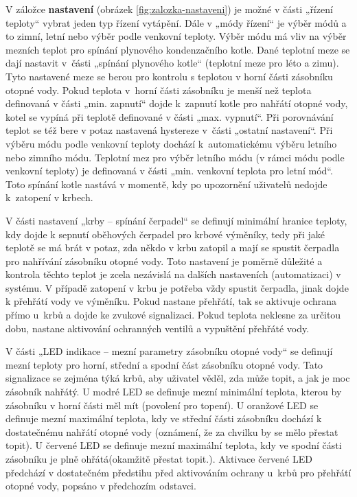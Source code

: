 V záložce \textbf{nastavení} (obrázek \ref{fig:zalozka-nastaveni}) je možné v části „řízení teploty“ vybrat jeden typ řízení vytápění. Dále v „módy řízení“ je výběr módů a to zimní, letní nebo výběr podle venkovní teploty. Výběr módu má vliv na výběr mezních teplot pro spínání plynového kondenzačního kotle. Dané teplotní meze se dají nastavit v~části „spínání plynového kotle“ (teplotní meze pro léto a zimu). Tyto nastavené meze se berou pro kontrolu s teplotou v horní části zásobníku otopné vody. Pokud teplota v~horní části zásobníku je menší než teplota definovaná v části „min. zapnutí“ dojde k~zapnutí kotle pro nahřátí otopné vody, kotel se vypíná při teplotě definované v části „max. vypnutí“. Při porovnávání teplot se též bere v potaz nastavená hystereze v~části „ostatní nastavení“. Při výběru módu podle venkovní teploty dochází k~automatickému výběru letního nebo zimního módu. Teplotní mez pro výběr letního módu (v rámci módu podle venkovní teploty) je definovaná v části „min. venkovní teplota pro letní mód“. Toto spínání kotle nastává v momentě, kdy po upozornění uživatelů nedojde k~zatopení v krbech.


V části nastavení „krby – spínání čerpadel“ se definují minimální hranice teploty, kdy dojde k sepnutí oběhových čerpadel pro krbové výměníky, tedy při jaké teplotě se má brát v potaz, zda někdo v krbu zatopil a mají se spustit čerpadla pro nahřívání zásobníku otopné vody. Toto nastavení je poměrně důležité a kontrola těchto teplot je zcela nezávislá na dalších nastaveních (automatizaci) v systému. V případě zatopení v krbu je potřeba vždy spustit čerpadla, jinak dojde k přehřátí vody ve výměníku. Pokud nastane přehřátí, tak se  aktivuje ochrana přímo u~krbů a dojde ke zvukové signalizaci. Pokud teplota neklesne za určitou dobu, nastane aktivování ochranných ventilů a vypuštění přehřáté vody.


V části „LED indikace – mezní parametry zásobníku otopné vody“ se definují mezní teploty pro horní, střední a spodní část zásobníku otopné vody. Tato signalizace se zejména týká krbů, aby uživatel věděl, zda může topit, a jak je moc zásobník nahřátý. U modré LED se definuje mezní minimální teplota, kterou by zásobníku v horní části měl mít (povolení pro topení). U oranžové LED se definuje mezní maximální teplota, kdy ve střední části zásobníku dochází k dostatečnému nahřátí otopné vody (oznámení, že za chvilku by se mělo přestat topit). U červené LED se definuje mezní maximální teplota, kdy ve spodní části zásobníku je plně ohřátá(okamžitě přestat topit.). Aktivace červené LED předchází v dostatečném předstihu před aktivováním ochrany u~krbů pro přehřátí otopné vody, popsáno v předchozím odstavci.

